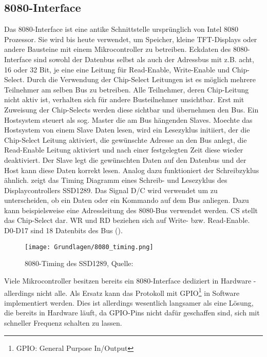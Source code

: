 \subsection{8080-Interface}
Das 8080-Interface ist eine antike Schnittstelle ursprünglich von Intel 8080 Prozessor. Sie wird bis heute verwendet, um Speicher, kleine TFT-Displays oder andere Bausteine mit einem Mikrocontroller zu betreiben. Eckdaten des 8080-Interface sind sowohl der Datenbus selbst als auch der Adressbus mit z.B. acht, 16 oder 32 Bit, je eine eine Leitung für Read-Enable, Write-Enable und Chip-Select. Durch die Verwendung der Chip-Select Leitungen ist es möglich mehrere Teilnehmer am selben Bus zu betreiben. Alle Teilnehmer, deren Chip-Leitung nicht aktiv ist, verhalten sich für andere Busteilnehmer unsichtbar. Erst mit Zuweisung der Chip-Selects werden diese sichtbar und übernehmen den Bus. Ein Hostsystem steuert als sog. Master die am Bus hängenden Slaves. Moechte das Hostsystem von einem Slave Daten lesen, wird ein Lesezyklus initiiert, der die Chip-Select Leitung aktiviert, die gewünschte Adresse an den Bus anlegt, die Read-Enable Leitung aktiviert und nach einer festgelegten Zeit diese wieder deaktiviert. Der Slave legt die gewünschten Daten auf den Datenbus und der Host kann diese Daten korrekt lesen. Analog dazu funktioniert der Schreibzyklus ähnlich. 
 zeigt das Timing Diagramm eines Schreib- und Lesezyklus des Displaycontrollers SSD1289. Das Signal D/C wird verwendet um zu unterscheiden, ob ein Daten oder ein Kommando auf dem Bus anliegen. Dazu kann beispielsweise eine Adressleitung des 8080-Bus verwendet werden. CS stellt das Chip-Select dar. WR und RD beziehen sich auf Write- bzw. Read-Enable. D0-D17 sind 18 Datenbits des Bus (\cite{SSD2007}). 
\begin{figure}[htp]
	\centering
	\texttt{[image: Grundlagen/8080\_timing.png]}
	\caption{8080-Timing des SSD1289, Quelle: \cite{SSD2007}}
	\label{fig:8080_timing}
\end{figure}


Viele Mikrocontroller besitzen bereits ein 8080-Interface dediziert in Hardware - allerdings nicht alle. Als Ersatz kann das Protokoll mit GPIO\footnote{GPIO: General Purpose In/Output} in Software implementiert werden. Dies ist allerdings wesentlich langsamer als eine Lösung, die bereits in Hardware läuft, da GPIO-Pins nicht dafür geschaffen sind, sich mit schneller Frequenz schalten zu lassen.
\clearpage

